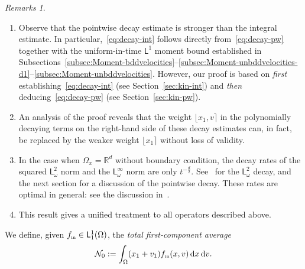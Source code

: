 \documentclass[11pt]{amsart}
\theoremstyle{definition}
\theoremstyle{remark}
\newtheorem{remarks}[theorem]{Remarks}
\numberwithin{equation}{section}
\newcommand\R{{\mathbb R}}
\def\NN{{\mathcal N}}
\newcommand{\dd}{{\, \mathrm d}}
\newcommand{\init}{\text{{\tiny {\rm in}}}}
\newcommand{\sfL}{\mathsf{L}}
\newcommand{\wangle}[1]{\lfloor #1 \rceil}
\begin{document}
\begin{remarks}
  \begin{enumerate}
  \item Observe that the pointwise decay estimate is stronger than the integral estimate. In particular,~\eqref{eq:decay-int} follows directly from~\eqref{eq:decay-pw} together with the uniform-in-time $\sfL^1$ moment bound established in Subsections~\ref{subsec:Moment-bddvelocities}--\ref{subsec:Moment-unbddvelocities-d1}--\ref{subsec:Moment-unbddvelocities}. However, our proof is based on \textit{first} establishing~\eqref{eq:decay-int} (see Section~\ref{sec:kin-int}) and \textit{then} deducing~\eqref{eq:decay-pw} (see Section~\ref{sec:kin-pw}).
  \item An analysis of the proof reveals that the weight $\wangle{x_1, v}$ in the polynomially decaying terms on the right-hand side of these decay estimates can, in fact, be replaced by the weaker weight $\wangle{x_1}$ without loss of validity.
  \item In the case when $\Omega_x = \R^d$ without boundary condition, the decay rates of the squared $\sfL^{2}_\omega$ norm and the $\sfL^{\infty}_\omega$ norm are only $t^{-\frac{d}2}$. See~\cite[Theorem 1]{zbMATH07239825} for the $\sfL^{2}_\omega$ decay, and the next section for a discussion of the pointwise decay. These rates are optimal in general: see the discussion in~\cite{zbMATH07239825}.
  \item This result gives a unified treatment to all operators described above.
  \end{enumerate}
\end{remarks}
We define, given $f_{\init} \in \sfL^{1} _{1}(\Omega)$, the \emph{total first-component average}
\begin{equation}
  \label{eq:defMMM0}
  \NN_0 := \int_\Omega (x_1+v_1) f_{\init}(x,v) \dd x \dd v.
\end{equation}
\end{document}
